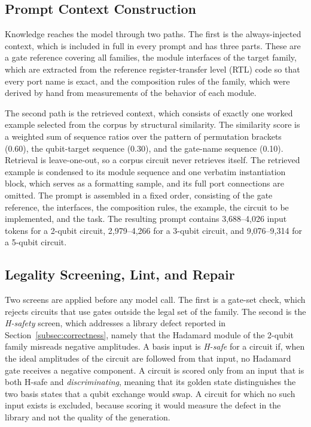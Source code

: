 \documentclass[conference]{IEEEtran}
\begin{document}
\subsection{Prompt Context Construction}
\label{subsec:paths}

Knowledge reaches the model through two paths. The first is the
always-injected context, which is included in full in every prompt and has
three parts. These are a gate reference covering all families, the module
interfaces of the target family, which are extracted from the reference
register-transfer level (RTL) code so that every port name is exact, and
the composition rules of the family, which were derived by hand from
measurements of the behavior of each module. 

The second path is the
retrieved context, which consists of exactly one worked example selected
from the corpus by structural similarity. The similarity score is a
weighted sum of sequence ratios over the pattern of permutation brackets
(0.60), the qubit-target sequence (0.30), and the gate-name sequence
(0.10). Retrieval is leave-one-out, so a corpus circuit never retrieves
itself. The retrieved example is condensed to its module sequence and one
verbatim instantiation block, which serves as a formatting sample, and its
full port connections are omitted. The prompt is assembled in a fixed
order, consisting of the gate reference, the interfaces, the composition rules, the
example, the circuit to be implemented, and the task. The resulting prompt
contains 3,688--4,026 input tokens for a 2-qubit circuit, 2,979--4,266 for
a 3-qubit circuit, and 9,076--9,314 for a 5-qubit circuit.

\subsection{Legality Screening, Lint, and Repair}
\label{subsec:screening}

Two screens are applied before any model call. The first is a gate-set
check, which rejects circuits that use gates outside the legal set of the
family. The second is the \emph{H-safety} screen, which addresses a library
defect reported in Section~\ref{subsec:correctness}, namely that the
Hadamard module of the 2-qubit family misreads negative amplitudes. A basis
input is \emph{H-safe} for a circuit if, when the ideal amplitudes of the
circuit are followed from that input, no Hadamard gate receives a negative
component. A circuit is scored only from an input that is both H-safe and \emph{discriminating}, meaning that its golden state distinguishes the two basis states that a qubit exchange would swap. A circuit for which no such input exists is excluded, because scoring it would measure the defect in the library and not the quality of the generation. 
\end{document}
